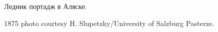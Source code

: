 \documentclass[a4paper,12pt]{ncc}
\begin{document}
\begin{figure}[h]
\begin{minipage}[h]{0.49\linewidth}
\end{minipage}
\hfill
\begin{minipage}[h]{0.49\linewidth}
\end{minipage}
\caption{Ледник портадж в Аляске.}
\label{ris:image1}
\end{figure}

\begin{figure}[h]
\begin{minipage}[h]{0.49\linewidth}
\end{minipage}
\hfill
\begin{minipage}[h]{0.49\linewidth}
\end{minipage}
\caption{1875 photo courtesy H. Slupetzky/University of Salzburg Pasterze.}
\label{ris:image1}
\end{figure}
\end{document}
